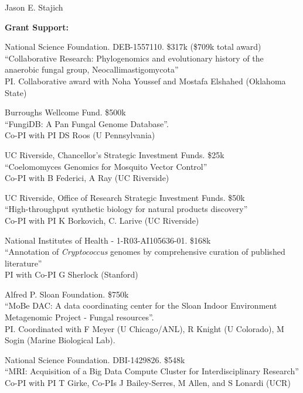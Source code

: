 \documentclass[10pt]{article}
\begin{document}
\begin{cv}{\centerline{Jason E. Stajich}}
\begin{cvlistcompact}{\bf Grant Support:}
\item [2016-2019] National Science Foundation. DEB-1557110. \$317k
  (\$709k total award) \\
``Collaborative Research: Phylogenomics and evolutionary history of the anaerobic fungal group, Neocallimastigomycota'' \\
PI. Collaborative award with Noha Youssef and Mostafa Elshahed (Oklahoma State)
 
\item [{\bf Completed support}]

\item [2010-2013] Burroughs Wellcome Fund. \$500k \\
 ``FungiDB: A Pan Fungal Genome Database''. \\
Co-PI with PI DS Roos (U Pennsylvania)

\item [2011-2012] UC Riverside, Chancellor's Strategic Investment
  Funds. \$25k \\
``Coelomomyces Genomics for Mosquito Vector Control'' \\
Co-PI with B Federici, A Ray (UC Riverside)

\item [2013-2014] UC Riverside, Office of Research Strategic Investment
  Funds. \$50k \\
``High-throughput synthetic biology for natural products discovery'' \\
Co-PI with PI K Borkovich, C. Larive (UC Riverside)

\item [2013-2014] National Institutes of Health - 1-R03-AI105636-01. \$168k \\
``Annotation of \textit{Cryptococcus} genomes by comprehensive
  curation of published literature'' \\
PI with Co-PI G Sherlock (Stanford)

  \item [2011-2014] Alfred P. Sloan Foundation. \$750k \\
``MoBe DAC: A data coordinating center for the Sloan Indoor
Environment Metagenomic Project - Fungal resources''. \\
PI.  Coordinated with F Meyer (U Chicago/ANL), R Knight (U Colorado), M Sogin (Marine Biological Lab).

\item [2014-2015] National Science Foundation. DBI-1429826. \$548k \\
``MRI: Acquisition of a Big Data Compute Cluster for Interdisciplinary
  Research''
Co-PI with PI T Girke, Co-PIs J Bailey-Serres, M Allen, and S Lonardi (UCR)


\end{cvlistcompact}
\end{cv}
\end{document}
